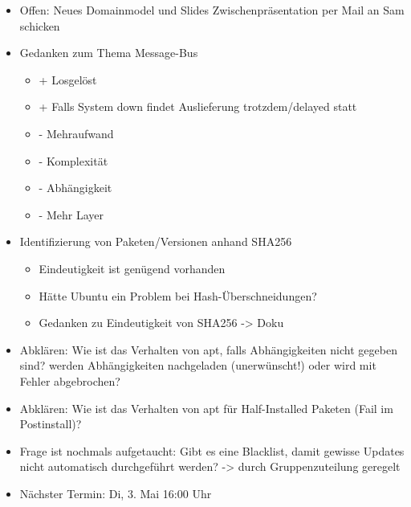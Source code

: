 \documentclass[class=scrbook,crop=false]{standalone}
\begin{document}
	\begin{itemize}
        \item Offen: Neues Domainmodel und Slides Zwischenpräsentation per Mail an Sam schicken
        \item Gedanken zum Thema Message-Bus
        \begin{itemize}
            \item + Losgelöst
            \item + Falls System down findet Auslieferung trotzdem/delayed statt
            \item - Mehraufwand
            \item - Komplexität
            \item - Abhängigkeit
            \item - Mehr Layer
        \end{itemize}
        \item Identifizierung von Paketen/Versionen anhand SHA256
        \begin{itemize}
            \item Eindeutigkeit ist genügend vorhanden
            \item Hätte Ubuntu ein Problem bei Hash-Überschneidungen?
            \item Gedanken zu Eindeutigkeit von SHA256 -> Doku
        \end{itemize}
        \item Abklären: Wie ist das Verhalten von apt, falls Abhängigkeiten nicht gegeben sind? werden Abhängigkeiten nachgeladen (unerwünscht!) oder wird mit Fehler abgebrochen?
        \item Abklären: Wie ist das Verhalten von apt für Half-Installed Paketen (Fail im Postinstall)?
        \item Frage ist nochmals aufgetaucht: Gibt es eine Blacklist, damit gewisse Updates nicht automatisch durchgeführt werden? -> durch Gruppenzuteilung geregelt
        \item Nächster Termin: Di, 3. Mai 16:00 Uhr
    \end{itemize}
\end{document}
